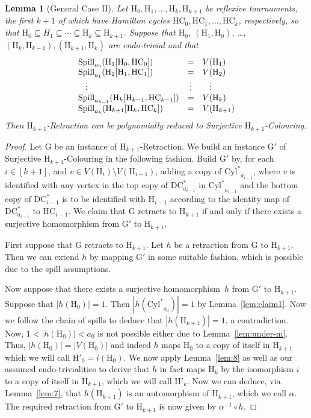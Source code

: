\documentclass[a4paper,12pt]{article}
\newtheorem{lemma}{Lemma}
\theoremstyle{remark}
\newcommand{\HC}[0]{\ensuremath{\mathrm{HC}}}
\newcommand{\DC}[0]{\ensuremath{\mathrm{DC}}}
\newcommand{\Cyl}[0]{\ensuremath{\mathrm{Cyl}^*}}
\newcommand{\G}{\ensuremath{\mathrm{G}}}
\renewcommand{\H}{\ensuremath{\mathrm{H}}}
\begin{document}
\begin{lemma}[General Case II]
\label{prop:main-general2}
Let  $\H_{0},\H_{1}, \ldots, \H_k, \H_{k+1}$ be reflexive tournaments, the first $k+1$ of which have Hamilton cycles $\HC_{0},\HC_{1}, \ldots, \HC_{k}$, respectively,
so that $\H_0 \subseteq H_1 \subseteq \cdots \subseteq \H_k \subseteq \H_{k+1}$.
Suppose that $\H_0$, $(\H_1,\H_0)$, \ldots, $(\H_{k},\H_{k-1}), (\H_{k+1},\H_{k})$ are endo-trivial and that
\[
\begin{array}{lcl}
\mathrm{Spill}_{a_0}(\H_1[\H_0,\HC_{0}]) &= &V(\H_1) \\
\mathrm{Spill}_{a_1}(\H_2[\H_1,\HC_{1}]) &= &V(\H_2) \\
\hspace*{3mm} \vdots &\vdots &\hspace*{3mm}\vdots \\
\mathrm{Spill}_{a_{k-1}}(\H_{k}[\H_{k-1},\HC_{k-1}]) &= &V(\H_k)\\
\mathrm{Spill}_{a_{k}}(\H_{k+1}[\H_{k},\HC_{k}]) &= &V(\H_{k+1})
\end{array}
\]
Then {\sc $\H_{k+1}$-Retraction} can be polynomially reduced to {\sc Surjective $\H_{k+1}$-Colouring}.
\end{lemma}
\begin{proof}
Let $\G$ be an instance of {\sc $\H_{k+1}$-Retraction}.
We build an instance $\G'$ of {\sc Surjective $\H_{k+1}$-Colouring}
in the following fashion. Build $\G'$ by, for each $i \in [k+1]$, and $v \in V(\H_{i}) \setminus V(\H_{i-1})$, adding a copy of $\Cyl_{a_{i-1}}$, where $v$ is identified with any vertex in the top copy of $\DC^*_{a_{i-1}}$ in $\Cyl_{a_{i-1}}$ and the bottom copy of $\DC^*_{i-1}$ is to be identified with $\H_{i-1}$ according to the identity map of $\DC^*_{a_{i-1}}$ to $\HC_{i-1}$.
We claim that $\G$ retracts to $\H_{k+1}$ if and only if there exists a surjective homomorphism from $\G'$ to $\H_{k+1}$.

First suppose that $\G$ retracts to $\H_{k+1}$.
Let $h$ be a retraction from $\G$ to $\H_{k+1}$. Then we can extend $h$ by mapping $\G'$ in some suitable fashion, which is possible due to the spill assumptions.

Now suppose that there exists a surjective homomorphism~$h$ from $\G'$ to $\H_{k+1}$. 
Suppose that $|h(\H_0)|=1$. Then $|h(\Cyl_{a_0})|=1$ by Lemma~\ref{lem:claim1}. Now we follow the chain of spills to deduce that $|h(\H_{k+1})|=1$, a contradiction. 
Now, $1<|h(\H_0)|<a_0$ is not possible either due to Lemma~\ref{lem:under-m}. 
Thus, $|h(\H_0)|=|V(\H_0)|$ and indeed $h$ maps $\H_0$ to a copy of itself in $\H_{k+1}$ which we will call $\H'_0=i(\H_0)$. We now apply Lemma~\ref{lem:8} as well as our assumed endo-trivialities to derive that $h$ in fact maps $\H_k$ by the isomorphism $i$ to a copy of itself in $\H_{k+1}$, which we will call $\H'_{k}$. Now we can deduce, via Lemma~\ref{lem:7}, that $h(\H_{k+1})$ is an automorphism of $\H_{k+1}$, which we call $\alpha$. The required retraction from $\G'$ to 
$\H_{k+1}$ 
is now given by $\alpha^{-1} \circ h$.
\end{proof}
\end{document}

